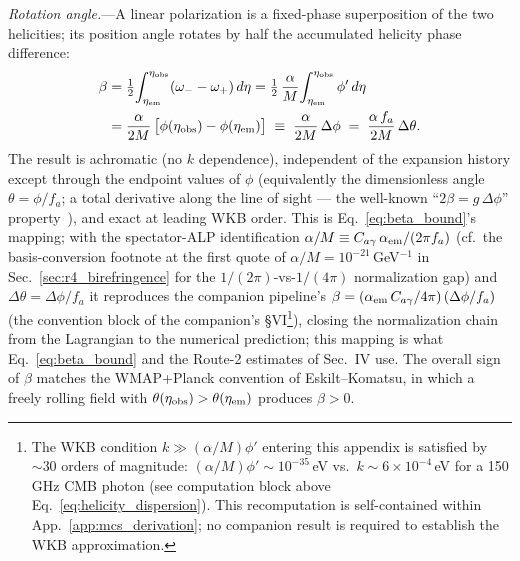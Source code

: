 \documentclass[aps,prd,twocolumn,superscriptaddress,showpacs,preprintnumbers,nofootinbib,longbibliography,floatfix]{revtex4-2}
\begin{document}
\textit{Rotation angle.}---A linear polarization is a fixed-phase
superposition of the two helicities; its position angle rotates by half
the accumulated helicity phase difference:
\begin{align}
\beta &= \tfrac{1}{2}\!\int_{\eta_{\rm em}}^{\eta_{\rm obs}}
(\omega_- - \omega_+)\,d\eta
= \tfrac{1}{2}\,\frac{\alpha}{M}\!\int_{\eta_{\rm em}}^{\eta_{\rm obs}}
\phi'\,d\eta \nonumber\\
&= \frac{\alpha}{2M}\,\bigl[\phi(\eta_{\rm obs})
- \phi(\eta_{\rm em})\bigr]
\;\equiv\; \frac{\alpha}{2M}\,\Delta\phi
\;=\; \frac{\alpha\,f_a}{2M}\,\Delta\theta .
\label{eq:beta_derived}
\end{align}
The result is achromatic (no $k$ dependence), independent of the
expansion history except through the endpoint values of $\phi$ (equivalently
the dimensionless angle $\theta=\phi/f_a$; a total derivative along the
line of sight --- the well-known
``$2\beta = g\,\Delta\phi$'' property~\cite{HarariSikivie1992}), and
exact at leading WKB order. This is Eq.~\eqref{eq:beta_bound}'s
mapping; with the spectator-ALP identification
$\alpha/M \equiv C_{a\gamma}\,\alpha_{\rm em}/(2\pi f_a)$ (cf.\ the
basis-conversion footnote at the first quote of
$\alpha/M = 10^{-21}\,$GeV$^{-1}$ in Sec.~\ref{sec:r4_birefringence}
for the $1/(2\pi)$-vs-$1/(4\pi)$ normalization gap) and
$\Delta\theta = \Delta\phi/f_a$ it reproduces the companion pipeline's
$\beta = (\alpha_{\rm em}\,C_{a\gamma}/4\pi)\,(\Delta\phi/f_a)$
(the convention block of the companion's \S VI\footnote{The
WKB condition $k \gg (\alpha/M)\phi'$ entering this appendix is satisfied
by ${\sim}30$ orders of magnitude: $(\alpha/M)\phi' \sim 10^{-35}\,$eV
vs.\ $k\sim 6\times10^{-4}\,$eV for a 150\,GHz CMB photon
(see computation block above Eq.~\eqref{eq:helicity_dispersion}).
This recomputation is self-contained within App.~\ref{app:mcs_derivation};
no companion result is required to establish the WKB approximation.}),
closing the normalization chain from the Lagrangian to the numerical prediction;
this mapping is what Eq.~\eqref{eq:beta_bound} and the Route-2
estimates of Sec.~IV use. The overall sign of $\beta$ matches the
WMAP+Planck convention of Eskilt--Komatsu, in which a freely rolling
field with $\theta(\eta_{\rm obs}) > \theta(\eta_{\rm em})$ produces
$\beta > 0$.


\end{document}
